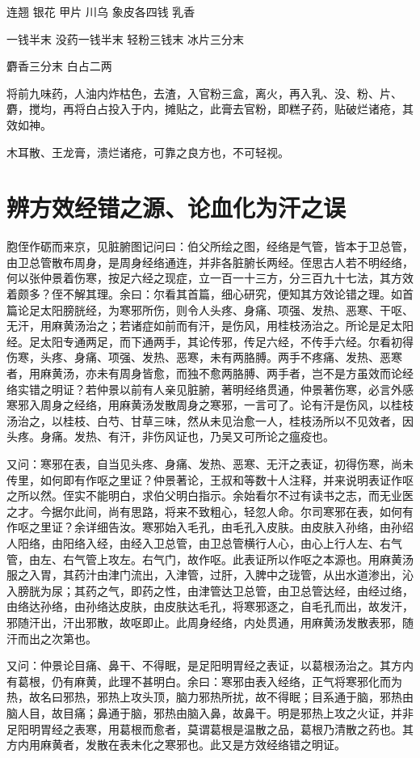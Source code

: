 \documentclass[a4paper,12pt,UTF8,twoside]{ctexbook}
\begin{document}
	连翘 银花 甲片 川乌 象皮各四钱 乳香
	
	一钱半末 没药一钱半末 轻粉三钱末 冰片三分末
	
	麝香三分末 白占二两
	
	将前九味药，人油内炸枯色，去渣，入官粉三盒，离火，再入乳、没、粉、片、麝，搅均，再将白占投入于内，摊贴之，此膏去官粉，即糕子药，贴破烂诸疮，其效如神。
	
	木耳散、王龙膏，溃烂诸疮，可靠之良方也，不可轻视。
	
	\chapter{辨方效经错之源、论血化为汗之误}
	
	
	胞侄作砺而来京，见脏腑图记问曰：伯父所绘之图，经络是气管，皆本于卫总管，由卫总管散布周身，是周身经络通连，并非各脏腑长两经。侄思古人若不明经络，何以张仲景着伤寒，按足六经之现症，立一百一十三方，分三百九十七法，其方效着颇多？侄不解其理。余曰：尔看其首篇，细心研究，便知其方效论错之理。如首篇论足太阳膀胱经，为寒邪所伤，则令人头疼、身痛、项强、发热、恶寒、干呕、无汗，用麻黄汤治之；若诸症如前而有汗，是伤风，用桂枝汤治之。所论是足太阳经。足太阳专通两足，而下通两手，其论传邪，传足六经，不传手六经。尔看初得伤寒，头疼、身痛、项强、发热、恶寒，未有两胳膊。两手不疼痛、发热、恶寒者，用麻黄汤，亦未有周身皆愈，而独不愈两胳膊、两手者，岂不是方虽效而论经络实错之明证？若仲景以前有人亲见脏腑，著明经络贯通，仲景著伤寒，必言外感寒邪入周身之经络，用麻黄汤发散周身之寒邪，一言可了。论有汗是伤风，以桂枝汤治之，以桂枝、白芍、甘草三味，然从未见治愈一人，桂枝汤所以不见效者，因头疼。身痛。发热、有汗，非伤风证也，乃吴又可所论之瘟疫也。
	
	又问：寒邪在表，自当见头疼、身痛、发热、恶寒、无汗之表证，初得伤寒，尚未传里，如何即有作呕之里证？仲景著论，王叔和等数十人注释，并来说明表证作呕之所以然。侄实不能明白，求伯父明白指示。余始看尔不过有读书之志，而无业医之才。今据尔此间，尚有思路，将来不致粗心，轻忽人命。尔司寒邪在表，如何有作呕之里证？余详细告汝。寒邪始入毛孔，由毛孔入皮肤。由皮肤入孙络，由孙绍人阳络，由阳络入经，由经入卫总管，由卫总管横行人心，由心上行人左、右气管，由左、右气管上攻左。右气门，故作呕。此表证所以作呕之本源也。用麻黄汤服之入胃，其药汁由津门流出，入津管，过肝，入脾中之珑管，从出水道渗出，沁入膀胱为尿；其药之气，即药之性，由津管达卫总管，由卫总管达经，由经过络，由络达孙络，由孙络达皮肤，由皮肤达毛孔，将寒邪逐之，自毛孔而出，故发汗，邪随汗出，汗出邪散，故呕即止。此周身经络，内处贯通，用麻黄汤发散表邪，随汗而出之次第也。
	
	又问：仲景论目痛、鼻干、不得眠，是足阳明胃经之表证，以葛根汤治之。其方内有葛根，仍有麻黄，此理不甚明白。余曰：寒邪由表入经络，正气将寒邪化而为热，故名曰邪热，邪热上攻头顶，脑力邪热所扰，故不得眠；目系通于脑，邪热由脑人目，故目痛；鼻通于脑，邪热由脑入鼻，故鼻干。明是邪热上攻之火证，并非足阳明胃经之表寒，用葛根而愈者，莫谓葛根是温散之品，葛根乃清散之药也。其方内用麻黄者，发散在表未化之寒邪也。此又是方效经络错之明证。
	
\end{document}
